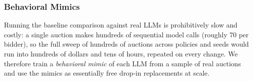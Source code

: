 \subsubsection{Behavioral Mimics}
\label{sec:mimics}
Running the baseline comparison against real LLMs is prohibitively slow and costly: a single auction makes hundreds of sequential model calls (roughly 70 per bidder), so the full sweep of hundreds of auctions across policies and seeds would run into hundreds of dollars and tens of hours, repeated on every change. We therefore train a \emph{behavioral mimic} of each LLM from a sample of real auctions and use the mimics as essentially free drop-in replacements at scale.

